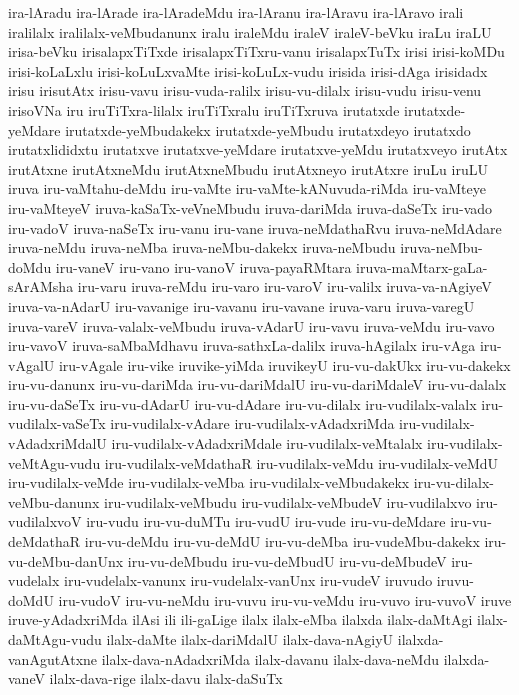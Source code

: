 {ira-lAradu
ira-lArade
ira-lAradeMdu
ira-lAranu
ira-lAravu
ira-lAravo
irali
iralilalx
iralilalx-veMbudanunx
iralu
iraleMdu
iraleV
iraleV-beVku
iraLu
iraLU
irisa-beVku
irisalapxTiTxde
irisalapxTiTxru-vanu
irisalapxTuTx
irisi
irisi-koMDu
irisi-koLaLxlu
irisi-koLuLxvaMte
irisi-koLuLx-vudu
irisida
irisi-dAga
irisidadx
irisu
irisutAtx
irisu-vavu
irisu-vuda-ralilx
irisu-vu-dilalx
irisu-vudu
irisu-venu
irisoVNa
iru
iruTiTxra-lilalx
iruTiTxralu
iruTiTxruva
irutatxde
irutatxde-yeMdare
irutatxde-yeMbudakekx
irutatxde-yeMbudu
irutatxdeyo
irutatxdo
irutatxlididxtu
irutatxve
irutatxve-yeMdare
irutatxve-yeMdu
irutatxveyo
irutAtx
irutAtxne
irutAtxneMdu
irutAtxneMbudu
irutAtxneyo
irutAtxre
iruLu
iruLU
iruva
iru-vaMtahu-deMdu
iru-vaMte
iru-vaMte-kANuvuda-riMda
iru-vaMteye
iru-vaMteyeV
iruva-kaSaTx-veVneMbudu
iruva-dariMda
iruva-daSeTx
iru-vado
iru-vadoV
iruva-naSeTx
iru-vanu
iru-vane
iruva-neMdathaRvu
iruva-neMdAdare
iruva-neMdu
iruva-neMba
iruva-neMbu-dakekx
iruva-neMbudu
iruva-neMbu-doMdu
iru-vaneV
iru-vano
iru-vanoV
iruva-payaRMtara
iruva-maMtarx-gaLa-sArAMsha
iru-varu
iruva-reMdu
iru-varo
iru-varoV
iru-valilx
iruva-va-nAgiyeV
iruva-va-nAdarU
iru-vavanige
iru-vavanu
iru-vavane
iruva-varu
iruva-varegU
iruva-vareV
iruva-valalx-veMbudu
iruva-vAdarU
iru-vavu
iruva-veMdu
iru-vavo
iru-vavoV
iruva-saMbaMdhavu
iruva-sathxLa-dalilx
iruva-hAgilalx
iru-vAga
iru-vAgalU
iru-vAgale
iru-vike
iruvike-yiMda
iruvikeyU
iru-vu-dakUkx
iru-vu-dakekx
iru-vu-danunx
iru-vu-dariMda
iru-vu-dariMdalU
iru-vu-dariMdaleV
iru-vu-dalalx
iru-vu-daSeTx
iru-vu-dAdarU
iru-vu-dAdare
iru-vu-dilalx
iru-vudilalx-valalx
iru-vudilalx-vaSeTx
iru-vudilalx-vAdare
iru-vudilalx-vAdadxriMda
iru-vudilalx-vAdadxriMdalU
iru-vudilalx-vAdadxriMdale
iru-vudilalx-veMtalalx
iru-vudilalx-veMtAgu-vudu
iru-vudilalx-veMdathaR
iru-vudilalx-veMdu
iru-vudilalx-veMdU
iru-vudilalx-veMde
iru-vudilalx-veMba
iru-vudilalx-veMbudakekx
iru-vu-dilalx-veMbu-danunx
iru-vudilalx-veMbudu
iru-vudilalx-veMbudeV
iru-vudilalxvo
iru-vudilalxvoV
iru-vudu
iru-vu-duMTu
iru-vudU
iru-vude
iru-vu-deMdare
iru-vu-deMdathaR
iru-vu-deMdu
iru-vu-deMdU
iru-vu-deMba
iru-vudeMbu-dakekx
iru-vu-deMbu-danUnx
iru-vu-deMbudu
iru-vu-deMbudU
iru-vu-deMbudeV
iru-vudelalx
iru-vudelalx-vanunx
iru-vudelalx-vanUnx
iru-vudeV
iruvudo
iruvu-doMdU
iru-vudoV
iru-vu-neMdu
iru-vuvu
iru-vu-veMdu
iru-vuvo
iru-vuvoV
iruve
iruve-yAdadxriMda
ilAsi
ili
ili-gaLige
ilalx
ilalx-eMba
ilalxda
ilalx-daMtAgi
ilalx-daMtAgu-vudu
ilalx-daMte
ilalx-dariMdalU
ilalx-dava-nAgiyU
ilalxda-vanAgutAtxne
ilalx-dava-nAdadxriMda
ilalx-davanu
ilalx-dava-neMdu
ilalxda-vaneV
ilalx-dava-rige
ilalx-davu
ilalx-daSuTx
}
